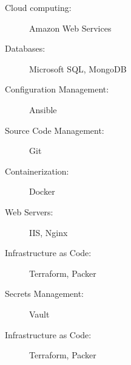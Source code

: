 
\begin{minipage}[t]{.3\linewidth}
  \raggedright
  \begin{description}
    \item[Cloud computing:] Amazon Web Services
  \end{description}
\end{minipage}%
\hfil
\begin{minipage}[t]{.3\linewidth}
  \raggedright
  \begin{description}
    \item[Databases:] Microsoft SQL, MongoDB
  \end{description}
\end{minipage}

\begin{minipage}[t]{.3\linewidth}
  \raggedright
  \begin{description}
    \item[Configuration Management:] Ansible
  \end{description}
\end{minipage}%
\hfil
\begin{minipage}[t]{.3\linewidth}
  \raggedright
  \begin{description}
    \item[Source Code Management:] Git
  \end{description}
\end{minipage}

\begin{minipage}[t]{.3\linewidth}
  \raggedright
  \begin{description}
    \item[Containerization:] Docker
  \end{description}
\end{minipage}%
\hfil
\begin{minipage}[t]{.3\linewidth}
  \raggedright
  \begin{description}
    \item[Web Servers:] IIS, Nginx
  \end{description}
\end{minipage}


\begin{minipage}[t]{.3\linewidth}
  \raggedright
  \begin{description}
    \item[Infrastructure as Code:] Terraform, Packer
  \end{description}
\end{minipage}%
\hfil
\begin{minipage}[t]{.3\linewidth}
  \raggedright
  \begin{description}
    \item[Secrets Management:] Vault
  \end{description}
\end{minipage}

\begin{minipage}[t]{.3\linewidth}
  \raggedright
  \begin{description}
    \item[Infrastructure as Code:] Terraform, Packer
  \end{description}
\end{minipage}
